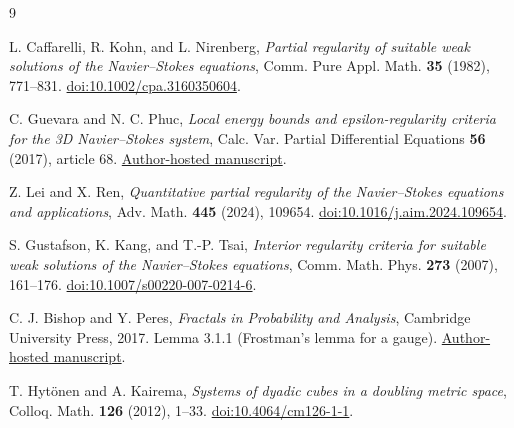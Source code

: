 \documentclass[11pt]{article}
\begin{document}
\begin{thebibliography}{9}
\small\raggedright
{}
L. Caffarelli, R. Kohn, and L. Nirenberg,
\emph{Partial regularity of suitable weak solutions of the Navier--Stokes
equations}, Comm. Pure Appl. Math. \textbf{35} (1982), 771--831.
\href{https://doi.org/10.1002/cpa.3160350604}{doi:10.1002/cpa.3160350604}.

C. Guevara and N. C. Phuc,
\emph{Local energy bounds and epsilon-regularity criteria for the 3D
Navier--Stokes system}, Calc. Var. Partial Differential Equations
\textbf{56} (2017), article 68.
\href{https://www.math.lsu.edu/~pcnguyen/papers_html/Guevara-Phuc-12-29-16.pdf}
{Author-hosted manuscript}.

Z. Lei and X. Ren,
\emph{Quantitative partial regularity of the Navier--Stokes equations and
applications}, Adv. Math. \textbf{445} (2024), 109654.
\href{https://doi.org/10.1016/j.aim.2024.109654}{doi:10.1016/j.aim.2024.109654}.

S. Gustafson, K. Kang, and T.-P. Tsai,
\emph{Interior regularity criteria for suitable weak solutions of the
Navier--Stokes equations}, Comm. Math. Phys. \textbf{273} (2007), 161--176.
\href{https://doi.org/10.1007/s00220-007-0214-6}{doi:10.1007/s00220-007-0214-6}.

C. J. Bishop and Y. Peres,
\emph{Fractals in Probability and Analysis}, Cambridge University Press,
2017. Lemma 3.1.1 (Frostman's lemma for a gauge).
\href{https://www.math.stonybrook.edu/~bishop/classes/math324.F15/book1Dec15.pdf}
{Author-hosted manuscript}.

T. Hyt\"onen and A. Kairema,
\emph{Systems of dyadic cubes in a doubling metric space},
Colloq. Math. \textbf{126} (2012), 1--33.
\href{https://doi.org/10.4064/cm126-1-1}{doi:10.4064/cm126-1-1}.
\end{thebibliography}
\end{document}
